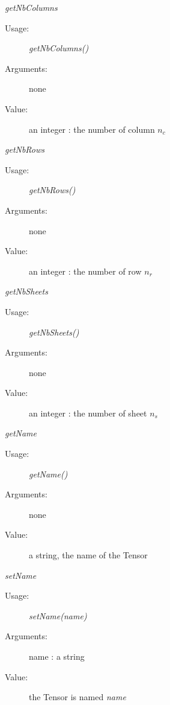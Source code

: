 \begin{description}
\begin{description}
\item \textit{getNbColumns}
\begin{description}
\item[Usage:] \textit{getNbColumns()}
\item[Arguments:] none
\item[Value:] an integer : the number of column $n_c$
\end{description}
\bigskip

\item \textit{getNbRows}
\begin{description}
\item[Usage:] \textit{getNbRows()}
\item[Arguments:] none
\item[Value:] an integer : the number of row $n_r$
\end{description}
\bigskip

\item \textit{getNbSheets}
\begin{description}
\item[Usage:] \textit{getNbSheets()}
\item[Arguments:] none
\item[Value:] an integer : the number of sheet $n_s$
\end{description}
\bigskip

\item \textit{getName}
\begin{description}
\item[Usage:] \textit{getName()}
\item[Arguments:] none
\item[Value:] a string, the name of the Tensor
\end{description}
\bigskip

\item \textit{setName}
\begin{description}
\item[Usage:] \textit{setName(name)}
\item[Arguments:] name : a string
\item[Value:] the Tensor is named \textit{name}
\end{description}
\bigskip

\end{description}

\end{description}


\newpage

